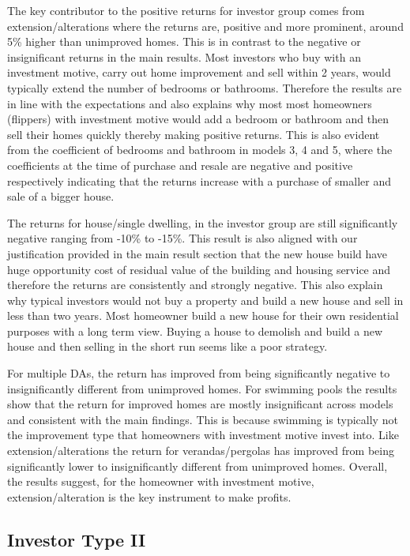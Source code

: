 \documentclass{article}
\begin{document}


The key contributor to the positive returns for investor group comes from extension/alterations where the returns are, positive and more prominent, around 5\% higher than unimproved homes. This is in contrast to the negative or insignificant returns in the main results. Most investors who buy with an investment motive, carry out home improvement and sell within 2 years, would typically extend the number of bedrooms or bathrooms. Therefore the results are in line with the expectations and also explains why most most homeowners (flippers) with investment motive would add a bedroom or bathroom and then sell their homes quickly thereby making positive returns. This is also evident from the coefficient of bedrooms and bathroom in models 3, 4 and 5, where the coefficients at the time of purchase and resale are negative and positive respectively indicating that the returns increase with a purchase of smaller and sale of a bigger house.

The returns for house/single dwelling, in the investor group are still significantly negative ranging from -10\% to -15\%. This result is also aligned with our justification provided in the main result section that the new house build have huge opportunity cost of residual value of the building and housing service and therefore the returns are consistently and strongly negative. This also explain why typical investors would not buy a property and build a new house and sell in less than two years. Most homeowner build a new house for their own residential purposes with a long term view. Buying a house to demolish and build a new house and then selling in the short run seems like a poor strategy.

For multiple DAs, the return has improved from being significantly negative to insignificantly different from unimproved homes. For swimming pools the results show that the return for improved homes are mostly insignificant across models and consistent with the main findings. This is because swimming is typically not the improvement type that homeowners with investment motive invest into. Like extension/alterations the return for verandas/pergolas has improved from being significantly lower to insignificantly different from unimproved homes. Overall, the results suggest, for the homeowner with investment motive, extension/alteration is the key instrument to make profits.  

\subsection{Investor Type II}
\end{document}

